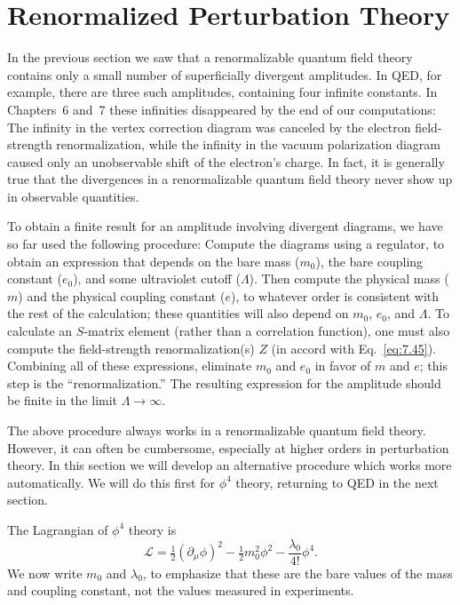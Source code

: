 \section{Renormalized Perturbation Theory}

In the previous section we saw that a renormalizable quantum field theory
contains only a small number of superficially divergent amplitudes.  In QED,
for example, there are three such amplitudes, containing four infinite
constants.  In Chapters~6 and~7 these infinities disappeared by the end of our
computations: The infinity in the vertex correction diagram was canceled by
the electron field-strength renormalization, while the infinity in the vacuum
polarization diagram caused only an unobservable shift of the electron's
charge.  In fact, it is generally true that the divergences in a renormalizable
quantum field theory never show up in observable quantities.

To obtain a finite result for an amplitude involving divergent diagrams, we
have so far used the following procedure: Compute the diagrams using a
regulator, to obtain an expression that depends on the bare mass ($m_0$), the
bare coupling constant ($e_0$), and some ultraviolet cutoff ($\Lambda$).
Then compute the physical mass ($m$) and the physical coupling constant
($e$), to whatever order is consistent with the rest of the calculation; these
quantities will also depend on $m_0$, $e_0$, and $\Lambda$.  To calculate an
$S$-matrix element (rather than a correlation function), one must also compute
the field-strength renormalization(s) $Z$ (in accord with Eq.~\eqref{eq:7.45}).
Combining all of these expressions, eliminate $m_0$ and $e_0$ in favor of $m$
and $e$; this step is the ``renormalization.''  The resulting expression for
the amplitude should be finite in the limit $\Lambda\to\infty$.

The above procedure always works in a renormalizable quantum field theory.
However, it can often be cumbersome, especially at higher orders in
perturbation theory.  In this section we will develop an alternative procedure
which works more automatically.  We will do this first for $\phi^4$ theory,
returning to QED in the next section.

The Lagrangian of $\phi^4$ theory is
\begin{equation}
  \mathcal{L} = \tfrac{1}{2}(\partial_\mu\phi)^2 - \tfrac{1}{2}m_0^2\phi^2
    - \frac{\lambda_0}{4!}\phi^4 .
\end{equation}
We now write $m_0$ and $\lambda_0$, to emphasize that these are the bare values
of the mass and coupling constant, not the values measured in experiments.

